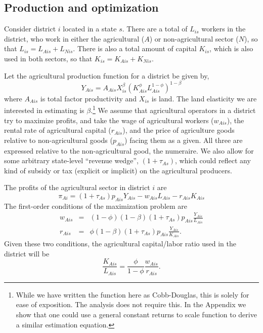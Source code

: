 \documentclass[11pt]{article}
\begin{document}
\subsection{Production and optimization}
Consider district $i$ located in a state $s$. There are a total of $L_{is}$ workers in the district, who work in either the agricultural ($A$) or non-agricultural sector ($N$), so that $L_{is} = L_{Ais} + L_{Nis}$. There is also a total amount of capital $K_{is}$, which is also used in both sectors, so that $K_{is} = K_{Ais} + K_{Nis}$.

Let the agricultural production function for a district be given by,
\begin{equation}
Y_{Ais} = A_{Ais} X_{is}^{\beta} \left(K_{Ais}^{\phi}L_{Ais}^{1-\phi}\right)^{1-\beta} \label{EQ_production}
\end{equation}
where $A_{Ais}$ is total factor productivity and $X_{is}$ is land. The land elasticity we are interested in estimating is $\beta$.\footnote{While we have written the function here as Cobb-Douglas, this is solely for ease of exposition. The analysis does not require this. In the Appendix we show that one could use a general constant returns to scale function to derive a similar estimation equation.} We assume that agricultural operators in a district try to maximize profits, and take the wage of agricultural workers ($w_{Ais}$), the rental rate of agricultural capital ($r_{Ais}$), and the price of agriculture goods relative to non-agricultural goods ($p_{Ais}$) facing them as a given. All three are expressed relative to the non-agricultural good, the numeraire. We also allow for some arbitrary state-level ``revenue wedge'', $(1+\tau_{As})$, which could reflect any kind of subsidy or tax (explicit or implicit) on the agricultural producers. 

The profits of the agricultural sector in district $i$ are
\begin{equation}
	\pi_{Ai} = (1+\tau_{As}) p_{Ais} Y_{Ais} - w_{Ais} L_{Ais} - r_{Ais} K_{Ais}
\end{equation}
The first-order conditions of the maximization problem are
\begin{eqnarray}
    w_{Ais} &=& (1-\phi)(1-\beta) (1+\tau_{As}) p_{Ais} \frac{Y_{Ais}}{L_{Ais}} \\ \nonumber 
    r_{Ais} &=& \phi(1-\beta) (1+\tau_{As}) p_{Ais} \frac{Y_{Ais}}{K_{Ais}}. \label{EQ_factorprices}
\end{eqnarray}
Given these two conditions, the agricultural capital/labor ratio used in the district will be
\begin{equation}
	\frac{K_{Ais}}{L_{Ais}} = \frac{\phi}{1-\phi} \frac{w_{Ais}}{r_{Ais}}. \label{EQ_KLag}
\end{equation}
\end{document}
